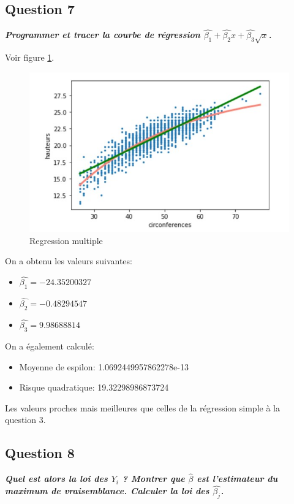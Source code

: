 \documentclass[pdflatex]{article}
\theoremstyle{definition}
\newcommand{\quest}[1]{\textbf{\textit{#1}} \vspace{3mm}}
\begin{document}
\subsection*{Question 7}
\quest{Programmer et tracer la courbe de r\'egression $\hat{\beta_1} + \hat{\beta_2}x + \hat{\beta_3}\sqrt{x}$.}

Voir figure \ref{fig:Regression multiple}.

\begin{figure}
	\includegraphics[scale=1]{regression_multiple.jpg}
    \caption{Regression multiple}
    \label{fig:Regression multiple}
\end{figure}

\vspace{5mm}
On a obtenu les valeurs suivantes:
\begin{itemize}
    \item $\hat{\beta_1} = -24.35200327$
    \item $\hat{\beta_2} = -0.48294547$
    \item $\hat{\beta_3} = 9.98688814$
\end{itemize}

\vspace{5mm}
On a \'egalement calcul\'e:
\begin{itemize}
    \item Moyenne de espilon: 1.0692449957862278e-13
    \item Risque quadratique: 19.32298986873724
\end{itemize}

\vspace{5mm}
Les valeurs proches mais meilleures que celles de la r\'egression simple \`a la question 3.


\subsection*{Question 8}
\quest{Quel est alors la loi des $Y_i$ ? Montrer que $\hat{\beta}$ est l'estimateur du maximum de vraisemblance. Calculer la loi des $\hat{\beta_j}$.}
\end{document}
